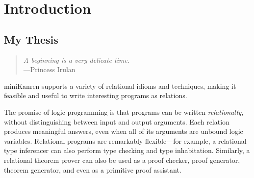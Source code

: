 \chapter{Introduction}\label{introchapter}

\section{My Thesis}
\begin{quotation}
\begin{flushright}
\textit{A beginning is a very delicate time.}\\
---Princess Irulan
\end{flushright}
\end{quotation}


\noindent miniKanren supports a variety of relational idioms and
techniques, making it feasible and useful to write interesting
programs as relations.

The promise of logic programming is that programs can be written {\em
  relationally}, without distinguishing between input and output
arguments.  Each relation produces meaningful answers, even when all
of its arguments are unbound logic variables.  Relational programs are
remarkably flexible---for example, a relational type inferencer can
also perform type checking and type inhabitation.  Similarly, a
relational theorem prover can also be used as a proof checker, proof
generator, theorem generator, and even as a primitive proof assistant.


